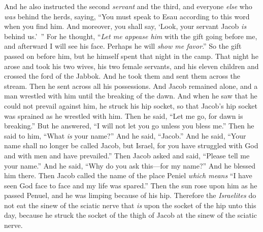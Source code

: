 \begin{biblechapter}
\verse And he also instructed the second \textit{servant} and the third, and everyone \textit{else} who \textit{was} behind the herds, saying, “You must speak to Esau according to this word when you find him.
\verse And moreover, you shall say, ‘Look, your servant Jacob \textit{is} behind us.’ ” For he thought, “\textit{Let me appease him} with the gift going before me, and afterward I will see his face. Perhaps he will \textit{show me favor}.”
\verse So the gift passed on before him, but he himself spent that night in the camp.
 That night he arose and took his two wives, his two female servants, and his eleven children and crossed the ford of the Jabbok.
\verse And he took them and sent them across the stream. Then he sent across all his possessions.
\verse And Jacob remained alone, and a man wrestled with him until the breaking of the dawn.
\verse And when he saw that he could not prevail against him, he struck his hip socket, so that Jacob’s hip socket was sprained as he wrestled with him.
\verse Then he said, “Let me go, for dawn is breaking.” But he answered, “I will not let you go unless you bless me.”
\verse Then he said to him, “What \textit{is} your name?” And he said, “Jacob.”
\verse And he said, “Your name shall no longer be called Jacob, but Israel, for you have struggled with God and with men and have prevailed.”
\verse Then Jacob asked and said, “Please tell me your name.” And he said, “Why do you ask this—for my name?” And he blessed him there.
\verse Then Jacob called the name of the place Peniel \textit{which means} “I have seen God face to face and my life was spared.”
\verse Then the sun rose upon him as he passed Penuel, and he was limping because of his hip.
\verse Therefore the \textit{Israelites} do not eat the sinew of the sciatic nerve that \textit{is} upon the socket of the hip unto this day, because he struck the socket of the thigh of Jacob at the sinew of the sciatic nerve.
\end{biblechapter}

